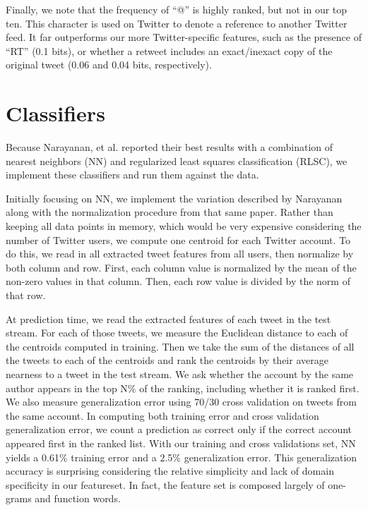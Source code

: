 \documentclass[10pt, conference, compsocconf]{IEEEtran}
\begin{document}
Finally, we note that the frequency of ``@'' is highly ranked, but not
in our top ten. This character is used on Twitter to denote a
reference to another Twitter feed. It far outperforms our more
Twitter-specific features, such as the presence of ``RT'' (0.1 bits),
or whether a retweet includes an exact/inexact copy of the original
tweet (0.06 and 0.04 bits, respectively).

\section{Classifiers}

Because Narayanan, et al. reported their best results with a
combination of nearest neighbors (NN) and regularized least squares
classification (RLSC), we implement these classifiers
and run them against the data.

Initially focusing on NN, we implement the variation described by Narayanan
along with the normalization procedure from that same paper. Rather
than keeping all data points in memory, which would be very expensive
considering the number of Twitter users, we compute one centroid for
each Twitter account. To do this, we read in all extracted tweet
features from all users, then normalize by both column and row. First,
each column value is normalized by the mean of the non-zero values in
that column. Then, each row value is divided by the norm of that row.

At prediction time, we read the extracted features of each tweet in
the test stream. For each of those tweets, we measure the Euclidean
distance to each of the centroids computed in training. Then we take
the sum of the distances of all the tweets to each of the centroids
and rank the centroids by their average nearness to a tweet in the
test stream. We ask whether the account by the same author appears in
the top N\% of the ranking, including whether it is ranked first. We
also measure generalization error using 70/30 cross validation on
tweets from the same account. In computing both training error and
cross validation generalization error, we count a prediction as
correct only if the correct account appeared first in the ranked
list. With our training and cross validations set, NN yields a 0.61\%
training error and a 2.5\% generalization error. This generalization
accuracy is surprising considering the relative simplicity and lack of
domain specificity in our featureset. In fact, the feature set is
composed largely of one-grams and function words.
\end{document}
